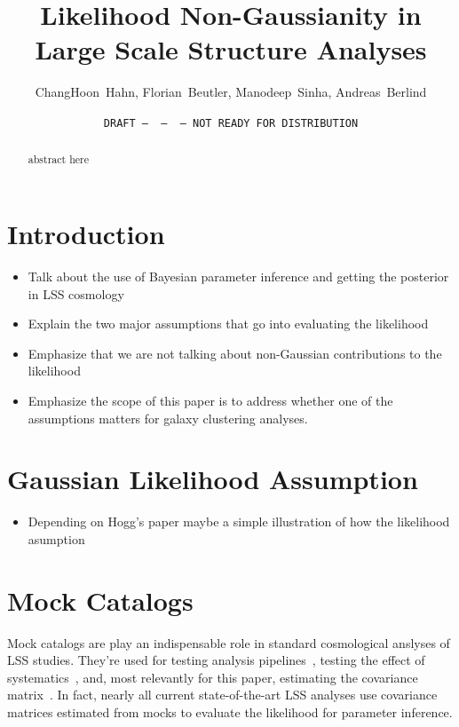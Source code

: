 \documentclass[12pt, letterpaper, preprint]{aastex}
\begin{document}
\sloppy\sloppypar\frenchspacing 

\title{Likelihood Non-Gaussianity in Large Scale Structure Analyses}
\date{\texttt{DRAFT~---~\githash~---~\gitdate~---~NOT READY FOR DISTRIBUTION}}
\author{ChangHoon~Hahn, Florian~Beutler, Manodeep~Sinha, Andreas~Berlind}

\begin{abstract}
    abstract here 
\end{abstract}


\section{Introduction}
\begin{itemize}
    \item Talk about the use of Bayesian parameter inference and getting the posterior in LSS cosmology 
    \item Explain the two major assumptions that go into evaluating the likelihood
    \item Emphasize that we are not talking about non-Gaussian contributions to the likelihood
    \item Emphasize the scope of this paper is to address whether one of the assumptions matters for 
        galaxy clustering analyses. 
\end{itemize}

\section{Gaussian Likelihood Assumption}
\begin{itemize}
    \item Depending on Hogg's paper maybe a simple illustration of how the likelihood asumption 
\end{itemize}


\section{Mock Catalogs}
Mock catalogs are play an indispensable role in standard cosmological 
anslyses of LSS studies. They're used for testing analysis 
pipelines~\citep[][]{beutler2017, grieb2017, tinkerinpreparation}, 
testing the effect of systematics~\citep{guo2012, vargas-magana2014, hahn2017, pinol2017, ross2017}, 
and, most relevantly for this paper, estimating the covariance 
matrix~\citep[][]{parkinson2012, kazin2014, grieb2017, alam2017, beutler2017, sinha2017a}. 
In fact, nearly all current state-of-the-art LSS analyses use
covariance matrices estimated from mocks to evaluate the likelihood 
for parameter inference. 
\end{document}
